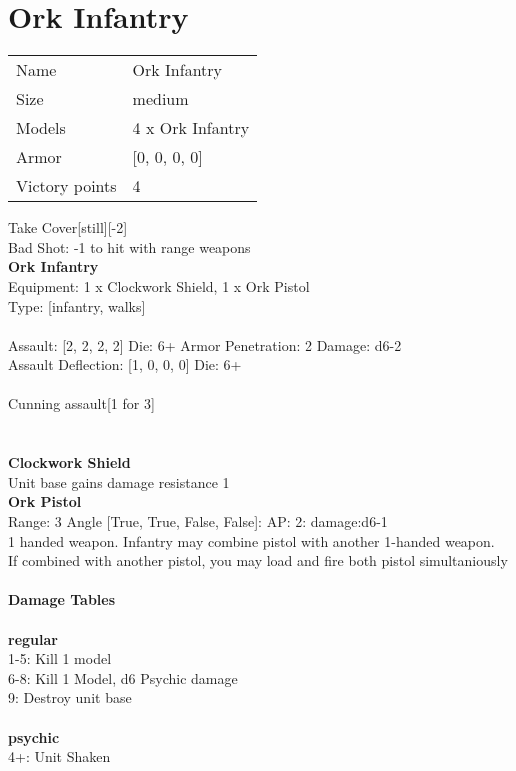 \pagebreak

\section{ Ork Infantry }

\begin{tabular}{ll}
  Name & Ork Infantry \\
  Size & medium\\
  Models & 4 x Ork Infantry\\
  Armor & [0, 0, 0, 0]\\
  Victory points & 4\\
\end{tabular}

Take Cover[still][-2]\\ 
Bad Shot: -1 to hit with range weapons\\ 


{\bf Ork Infantry } \\
Equipment: 1 x Clockwork Shield, 1 x Ork Pistol \\
Type: [infantry, walks] \\
\ \\
Assault: [2, 2, 2, 2] Die: 6+ Armor Penetration: 2 Damage: d6-2 \\
Assault Deflection: [1, 0, 0, 0] Die: 6+\\
\\ 
Cunning assault[1 for 3]\\ 
 
\ \\

\ \\
{\bf Clockwork Shield } \\

Unit base gains damage resistance 1\\ 





{\bf Ork Pistol } \\



Range: 3  Angle [True, True, False, False]: AP: 2: damage:d6-1 \\
1 handed weapon. Infantry may combine pistol with another 1-handed weapon.\\ 
If combined with another pistol, you may load and fire both pistol simultaniously\\ 




 
\ \\




{\bf Damage Tables} \\
\ \\ {\bf regular } \\
1-5: Kill 1 model \\
6-8: Kill 1 Model, d6 Psychic damage \\
9: Destroy unit base \\
\ \\ {\bf psychic } \\
4+: Unit Shaken \\










